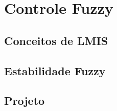 %

\chapter{Controle Fuzzy}
\label{capControle}

\section{Conceitos de LMIS}

\section{Estabilidade Fuzzy}

\section{Projeto}

%

